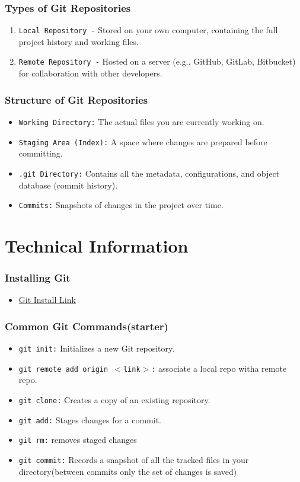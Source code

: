 \documentclass{beamer}
\begin{document}
\begin{frame}\frametitle{Types of Git Repositories}
\begin{enumerate}
\item \texttt{Local Repository -} Stored on your own computer, containing the full project history and working files.
\item \texttt{Remote Repository -} Hosted on a server (e.g., GitHub, GitLab, Bitbucket) for collaboration with other developers.
\end{enumerate}
\end{frame}


\begin{frame}\frametitle{Structure of Git Repositories}
\begin{itemize}
\item \texttt{Working Directory:} The actual files you are currently working on.
\item \texttt{Staging Area (Index):} A space where changes are prepared before committing.
\item \texttt{.git Directory:} Contains all the metadata, configurations, and object database (commit history).
\item \texttt{Commits:} Snapshots of changes in the project over time.
\end{itemize}
\end{frame}


\section{Technical Information}
\begin{frame}\frametitle{Installing Git}
    \begin{itemize}
    \item \href{https://git-scm.com/downloads}{Git Install Link}
    \end{itemize}
    \end{frame}


\begin{frame}\frametitle{Common Git Commands(starter)}
\begin{itemize}
\item \texttt{git init:} Initializes a new Git repository.
\item \texttt{git remote add origin $<$link$>$:} associate a local repo witha remote repo. 
\item \texttt{git clone:} Creates a copy of an existing repository.
\item \texttt{git add:} Stages changes for a commit.
\item \texttt{git rm:} removes staged changes
\item \texttt{git commit:} Records a snapshot of all the tracked files in your directory(between commits only the set of changes is saved)
\end{itemize}
\end{frame}
\end{document}
